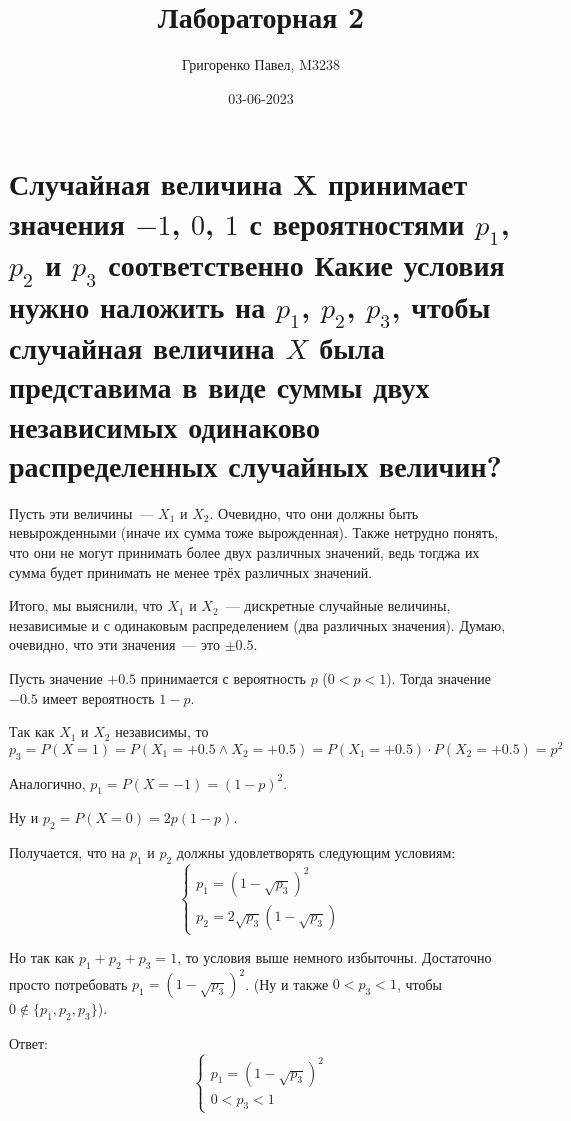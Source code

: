 \documentclass{report}
\title{Лабораторная 2}
\author{Григоренко Павел, M3238}
\date{03-06-2023}
\begin{document}
\maketitle
\chapter{
Случайная величина X принимает значения $-1$, $0$, $1$ с вероятностями $p_1$, $p_2$ и $p_3$ соответственно
Какие условия нужно наложить на $p_1$, $p_2$, $p_3$, чтобы случайная величина $X$
была представима в виде суммы двух независимых одинаково распределенных случайных величин?
}

Пусть эти величины~--- $X_1$ и $X_2$.
Очевидно, что они должны быть невырожденными (иначе их сумма тоже вырожденная).
Также нетрудно понять, что они не могут принимать более двух различных значений,
ведь тогджа их сумма будет принимать не менее трёх различных значений.

Итого, мы выяснили, что $X_1$ и $X_2$~--- дискретные случайные величины,
независимые и с одинаковым распределением (два различных значения).
Думаю, очевидно, что эти значения~--- это $\pm0.5$.

Пусть значение $+0.5$ принимается с вероятность $p$ ($0<p<1$).
Тогда значение $-0.5$ имеет вероятность $1-p$.

Так как $X_1$ и $X_2$ независимы, то
\[
    p_3=P\left( X=1 \right)=P\left(X_1=+0.5 \land X_2=+0.5\right)=
    P\left(X_1=+0.5\right)\cdot P\left(X_2=+0.5\right)=p^2
\]

Аналогично,  $p_1=P\left( X=-1 \right)=\left( 1-p \right)^2$.

Ну и $p_2=P\left( X=0 \right)=2p(1-p)$.

Получается, что на $p_1$ и $p_2$ должны удовлетворять следующим условиям:
\[
\begin{cases}
p_1=\left( 1-\sqrt{p_3} \right)^2 \\
p_2=2\sqrt{p_3}\left( 1-\sqrt{p_3} \right)
\end{cases}
\]

Но так как $p_1+p_2+p_3=1$, то условия выше немного избыточны.
Достаточно просто потребовать $p_1=\left( 1-\sqrt{p_3} \right)^2$.
(Ну и также $0<p_3<1$, чтобы $0\notin\{p_1,p_2,p_3\}$).

Ответ:
\[
\begin{cases}
p_1=\left( 1-\sqrt{p_3} \right)^2 \\
0<p_3<1
\end{cases}
\]
\end{document}
